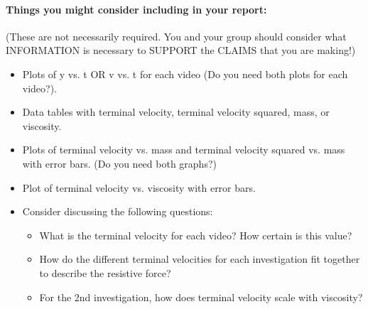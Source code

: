 \paragraph{Things you might consider including in your report:}
(These are not necessarily required. You and your group should consider what INFORMATION is necessary to SUPPORT the CLAIMS that you are making!)
\begin{itemize}
\item Plots of y vs. t OR v vs. t for each video (Do you need both plots for each video?).
\item Data tables with terminal velocity, terminal velocity squared, mass, or viscosity.
\item Plots of terminal velocity vs. mass and terminal velocity squared vs. mass with error bars. (Do you need both graphs?)
\item Plot of terminal velocity vs. viscosity with error bars.
\item Consider discussing the following questions:
	\begin{itemize}
	\item What is the terminal velocity for each video? How certain is this value?
	\item How do the different terminal velocities for each investigation fit together to describe the resistive force?
	\item For the 2nd investigation, how does terminal velocity scale with viscosity?
	\end{itemize}
\end{itemize}

